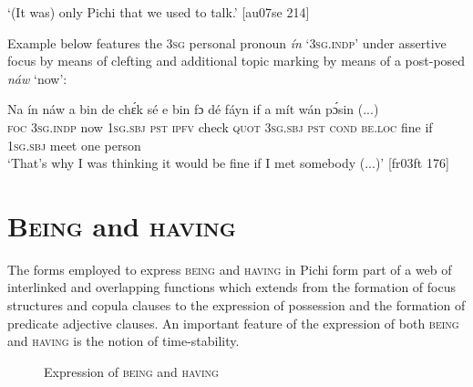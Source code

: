 \glt ‘(It was) only Pichi that we used to talk.’ [au07se 214]
\z

Example  below features the \textsc{3sg} personal pronoun \textit{ín} ‘\textsc{3sg.indp}’ under assertive focus by means of clefting and additional topic marking by means of a post-posed \textit{náw} ‘now’:


\ea%
    \label{ex:key:760}
    \gll Na  ín    náw    a    bin  de  chɛ́k  sé    e    bin  fɔ 
dé    fáyn    if  a    mít    wán    pɔ́sin  (...)\\
\textsc{foc}  \textsc{3sg.indp}  now    \textsc{1sg.sbj}  \textsc{pst}  \textsc{ipfv}  check  \textsc{quot}    \textsc{3sg.sbj}  \textsc{pst}  \textsc{cond} 
\textsc{be.loc}  fine    if  \textsc{1sg.sbj}  meet  one    person\\

\glt ‘That’s why I was thinking it would be fine if I met somebody (...)’ [fr03ft 176]
\z

\section{\textsc{Being} and \textsc{having}}\label{sec:7.6}

The forms employed to express \textsc{being} and \textsc{having} in Pichi form part of a web of interlinked and overlapping functions which extends from the formation of focus structures and copula clauses to the expression of possession and the formation of predicate adjective clauses. An important feature of the expression of both \textsc{being} and \textsc{having} is the notion of time-stability.

\begin{figure}


\caption{Expression of \textsc{being} and \textsc{having}}
\label{fig:key:7.2}
\end{figure}

